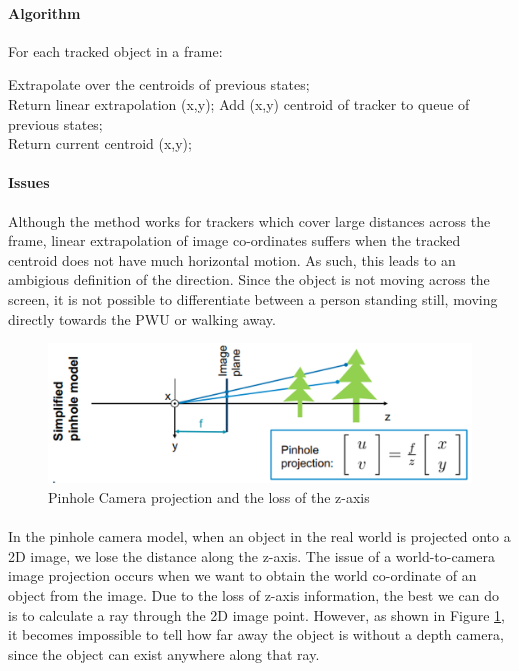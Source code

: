 \paragraph{Algorithm} For each tracked object in a frame:

\begin{algorithm}[ht] 
	
	{
		{
			{
				Extrapolate over the centroids of previous states; \\
				Return linear extrapolation (x,y);
			}
			{
				Add (x,y) centroid of tracker to queue of previous states;	\\
				Return current centroid (x,y);
			}
		}
	
	}
\end{algorithm}

\paragraph{Issues} Although the method works for trackers which cover large distances across the frame, linear extrapolation of image co-ordinates suffers when the tracked centroid does not have much horizontal motion. As such, this leads to an ambigious definition of the direction. Since the object is not moving across the screen, it is not possible to differentiate between a person standing still, moving directly towards the PWU or walking away.

\begin{figure}[ht]
	\centering
	\includegraphics[width=0.8\linewidth]{img/chapter4_analysis/pinholecamera.png}
	\caption{Pinhole Camera projection and the loss of the z-axis \cite{Leutenegger2019}}
	\label{fig:pinhole}
	\vspace{-1\baselineskip}
\end{figure}

\paragraph{} In the pinhole camera model, when an object in the real world is projected onto a 2D image, we lose the distance along the z-axis. The issue of a world-to-camera image projection occurs when we want to obtain the world co-ordinate of an object from the image. Due to the loss of z-axis information, the best we can do is to calculate a ray through the 2D image point. However, as shown in Figure \ref{fig:pinhole}, it becomes impossible to tell how far away the object is without a depth camera, since the object can exist anywhere along that ray.

